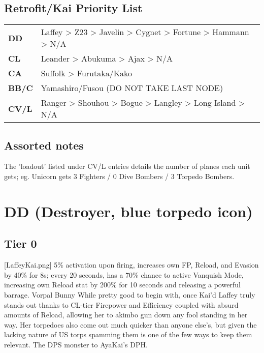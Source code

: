 \subsection{Retrofit/Kai Priority List}
\begin{tabularx}{\textwidth}{>{\bfseries}lX}
    DD                  & Laffey > Z23 > Javelin > Cygnet > Fortune > Hammann > N/A\\
    CL                  & Leander > Abukuma > Ajax > N/A\\
    CA                  & Suffolk > Furutaka/Kako\\
    BB/C                & Yamashiro/Fusou (DO NOT TAKE LAST NODE)\\
    CV/L                & Ranger > Shouhou > Bogue > Langley > Long Island > N/A\\
\end{tabularx}
 

\subsection{Assorted notes}
The 'loadout' listed under CV/L entries details the number of planes each unit gets; eg. Unicorn gets 3 Fighters / 0 Dive Bombers / 3 Torpedo Bombers.
 
\newpage
\pagestyle{content}
\section[DD]{DD (Destroyer, blue torpedo icon)}
\subsection{Tier 0}
[LaffeyKai.png]
{5\% activation upon firing, increases own FP, Reload, and Evasion by 40\% for 8s; every 20 seconds, has a 70\% chance to active Vanquish Mode, increasing own Reload stat by 200\% for 10 seconds and releasing a powerful barrage.}
{Vorpal Bunny}
{While pretty good to begin with, once Kai'd Laffey truly stands out thanks to CL-tier Firepower and Efficiency coupled with absurd amounts of Reload, allowing her to akimbo gun down any fool standing in her way. Her torpedoes also come out much quicker than anyone else's, but given the lacking nature of US torps spamming them is one of the few ways to keep them relevant. The DPS monster to AyaKai's DPH.}

